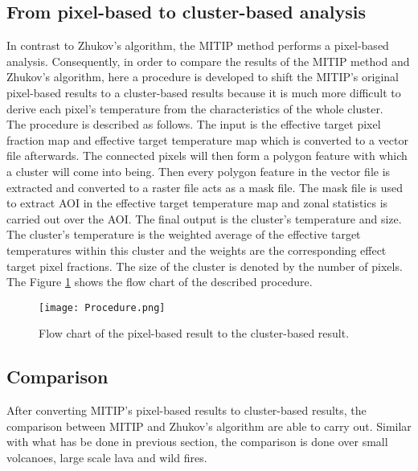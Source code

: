 \subsection{From pixel-based to cluster-based analysis}
In contrast to Zhukov's algorithm, the MITIP method performs a pixel-based analysis. Consequently, in order to compare the results of the MITIP method and Zhukov's algorithm, here a procedure is developed to shift the MITIP's original pixel-based results to a cluster-based results because it is much more difficult to derive each pixel's temperature from the characteristics of the whole cluster. \\

\noindent The procedure is described as follows. The input is the effective target pixel fraction map and effective target temperature map which is converted to a vector file afterwards. The connected pixels will then form a polygon feature with which a cluster will come into being. Then every polygon feature in the vector file is extracted and converted to a raster file acts as a mask file. The mask file is used to extract AOI in the effective target temperature map and zonal statistics is carried out over the AOI. The final output is the cluster's temperature and size. The cluster's temperature is the weighted average of the effective target temperatures within this cluster and the weights are the corresponding effect target pixel fractions. The size of the cluster is denoted by the number of pixels. The Figure \ref{fig:P2C} shows the flow chart of the described procedure.\\

\begin{figure}[!htbp]
\centering
\texttt{[image: Procedure.png]}
\caption{Flow chart of the pixel-based result to the cluster-based result.}
\label{fig:P2C}
\end{figure}


\subsection{Comparison}
After converting MITIP's pixel-based results to cluster-based results, the comparison between MITIP and Zhukov's algorithm are able to carry out. Similar with what has be done in previous section, the comparison is done over small volcanoes, large scale lava and wild fires.\\

